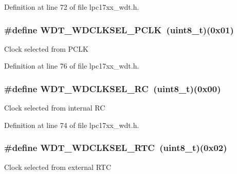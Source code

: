 \-Definition at line 72 of file lpc17xx\-\_\-wdt.\-h.

\hypertarget{group___w_d_t___private___macros_ga57d8247c4f86d49240666c9dd1dedfa4}{
\subsubsection[{\-W\-D\-T\-\_\-\-W\-D\-C\-L\-K\-S\-E\-L\-\_\-\-P\-C\-L\-K}]{\setlength{\rightskip}{0pt plus 5cm}\#define {\bf \-W\-D\-T\-\_\-\-W\-D\-C\-L\-K\-S\-E\-L\-\_\-\-P\-C\-L\-K}~(uint8\-\_\-t)(0x01)}}\label{group___w_d_t___private___macros_ga57d8247c4f86d49240666c9dd1dedfa4}
\-Clock selected from \-P\-C\-L\-K 

\-Definition at line 76 of file lpc17xx\-\_\-wdt.\-h.

\hypertarget{group___w_d_t___private___macros_ga7a773644003e35c52c0ae06bf01671d1}{
\subsubsection[{\-W\-D\-T\-\_\-\-W\-D\-C\-L\-K\-S\-E\-L\-\_\-\-R\-C}]{\setlength{\rightskip}{0pt plus 5cm}\#define {\bf \-W\-D\-T\-\_\-\-W\-D\-C\-L\-K\-S\-E\-L\-\_\-\-R\-C}~(uint8\-\_\-t)(0x00)}}\label{group___w_d_t___private___macros_ga7a773644003e35c52c0ae06bf01671d1}
\-Clock selected from internal \-R\-C 

\-Definition at line 74 of file lpc17xx\-\_\-wdt.\-h.

\hypertarget{group___w_d_t___private___macros_ga42a61bebca9f24c35621b354a522aa08}{
\subsubsection[{\-W\-D\-T\-\_\-\-W\-D\-C\-L\-K\-S\-E\-L\-\_\-\-R\-T\-C}]{\setlength{\rightskip}{0pt plus 5cm}\#define {\bf \-W\-D\-T\-\_\-\-W\-D\-C\-L\-K\-S\-E\-L\-\_\-\-R\-T\-C}~(uint8\-\_\-t)(0x02)}}\label{group___w_d_t___private___macros_ga42a61bebca9f24c35621b354a522aa08}
\-Clock selected from external \-R\-T\-C 

